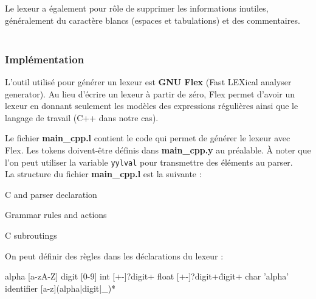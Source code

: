 \documentclass[a4paper]{article}%
\begin{document}
Le lexeur a également pour rôle de supprimer les informations inutiles,
généralement du caractère blancs (espaces et tabulations) et des
commentaires.\\~\\

\subsubsection{Implémentation}

L'outil utilisé pour générer un lexeur est \textbf{GNU Flex} (Fast LEXical
analyser generator). Au lieu d'écrire un lexeur à partir de zéro, Flex permet
d'avoir un lexeur en donnant seulement les modèles des expressions régulières
ainsi que le langage de travail (C++ dans notre cas).\\ %

\noindent

Le fichier \textbf{main\_cpp.l} contient le code qui permet de générer le lexeur
avec Flex. Les tokens doivent-être définis dans \textbf{main\_cpp.y} au
préalable. À noter que l'on peut utiliser la variable \lstinline{yylval} pour
transmettre des éléments au parser.\\

La structure du fichier \textbf{main\_cpp.l} est la suivante :

\begin{code}
C and parser declaration

Grammar rules and actions

C subroutings
\end{code}\leavevmode\newline

\noindent

On peut définir des règles dans les déclarations du lexeur :

\begin{code}

alpha [a-zA-Z]
digit [0-9]
int [+-]?{digit}+
float [+-]?{digit}+\.{digit}+
char '{alpha}'
identifier [a-z]({alpha}|{digit}|_)*
\end{code}\leavevmode\newline

\noindent

\end{document}
